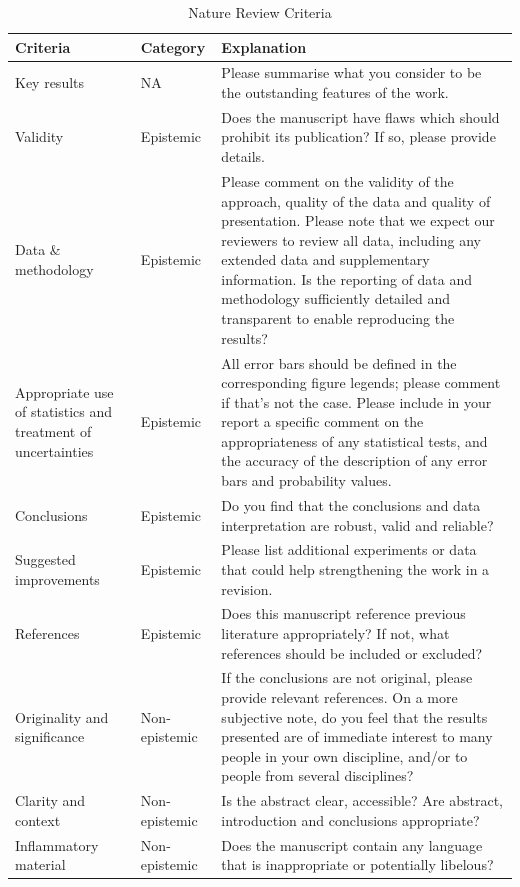 \begin{table}[H]
\centering
\begin{tabularx}{\textwidth}{|X|X|X|}
\hline
\textbf{Criteria} & \textbf{Category} & \textbf{Explanation} \\ 
\hline
Key results & NA & Please summarise what you consider to be the outstanding features of the work. \\ 
\hline
Validity & Epistemic & Does the manuscript have flaws which should prohibit its publication? If so, please provide details. \\ 
\hline
Data \& methodology & Epistemic & Please comment on the validity of the approach, quality of the data and quality of presentation. Please note that we expect our reviewers to review all data, including any extended data and supplementary information. Is the reporting of data and methodology sufficiently detailed and transparent to enable reproducing the results? \\ 
\hline
Appropriate use of statistics and treatment of uncertainties & Epistemic & All error bars should be defined in the corresponding figure legends; please comment if that’s not the case. Please include in your report a specific comment on the appropriateness of any statistical tests, and the accuracy of the description of any error bars and probability values. \\ 
\hline
Conclusions & Epistemic & Do you find that the conclusions and data interpretation are robust, valid and reliable? \\ 
\hline
Suggested improvements & Epistemic & Please list additional experiments or data that could help strengthening the work in a revision. \\ 
\hline
References & Epistemic & Does this manuscript reference previous literature appropriately? If not, what references should be included or excluded? \\ 
\hline
Originality and significance & Non-epistemic & If the conclusions are not original, please provide relevant references. On a more subjective note, do you feel that the results presented are of immediate interest to many people in your own discipline, and/or to people from several disciplines? \\ 
\hline
Clarity and context & Non-epistemic & Is the abstract clear, accessible? Are abstract, introduction and conclusions appropriate? \\ 
\hline
Inflammatory material & Non-epistemic & Does the manuscript contain any language that is inappropriate or potentially libelous? \\ 
\hline
\end{tabularx}
\caption{Nature Review Criteria}
\label{tab:nature_review}
\end{table}

